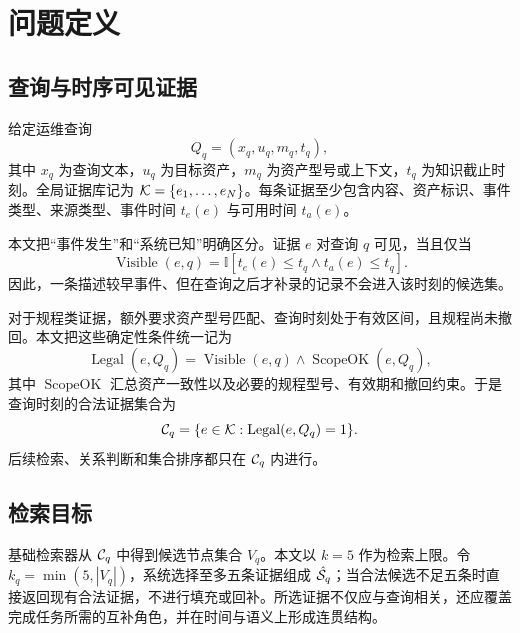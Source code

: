 \section{问题定义}
\label{sec:problem}

\subsection{查询与时序可见证据}

给定运维查询
\begin{equation}
Q_q=(x_q,u_q,m_q,t_q),
\end{equation}
其中 $x_q$ 为查询文本，$u_q$ 为目标资产，$m_q$ 为资产型号或上下文，$t_q$ 为知识截止时刻。全局证据库记为 $\mathcal{K}=\{e_1,\ldots,e_N\}$。每条证据至少包含内容、资产标识、事件类型、来源类型、事件时间 $t_e(e)$ 与可用时间 $t_a(e)$。

本文把“事件发生”和“系统已知”明确区分。证据 $e$ 对查询 $q$ 可见，当且仅当
\begin{equation}
\operatorname{Visible}(e,q)
=
\mathbb{I}\!\left[
t_e(e)\le t_q \land t_a(e)\le t_q
\right].
\label{eq:visible}
\end{equation}
因此，一条描述较早事件、但在查询之后才补录的记录不会进入该时刻的候选集。

对于规程类证据，额外要求资产型号匹配、查询时刻处于有效区间，且规程尚未撤回。本文把这些确定性条件统一记为
\begin{equation}
\operatorname{Legal}(e,Q_q)
=
\operatorname{Visible}(e,q)
\land
\operatorname{ScopeOK}(e,Q_q),
\label{eq:legal}
\end{equation}
其中 $\operatorname{ScopeOK}$ 汇总资产一致性以及必要的规程型号、有效期和撤回约束。于是查询时刻的合法证据集合为
\begin{equation}
\mathcal{C}_q
=
\{e\in\mathcal{K}:\operatorname{Legal}(e,Q_q)=1\}.
\label{eq:candidate}
\end{equation}
后续检索、关系判断和集合排序都只在 $\mathcal{C}_q$ 内进行。

\subsection{检索目标}

基础检索器从 $\mathcal{C}_q$ 中得到候选节点集合 $V_q$。本文以 $k=5$ 作为检索上限。令 $k_q=\min(5,|V_q|)$，系统选择至多五条证据组成 $\hat{\mathcal{S}}_q$；当合法候选不足五条时直接返回现有合法证据，不进行填充或回补。所选证据不仅应与查询相关，还应覆盖完成任务所需的互补角色，并在时间与语义上形成连贯结构。

